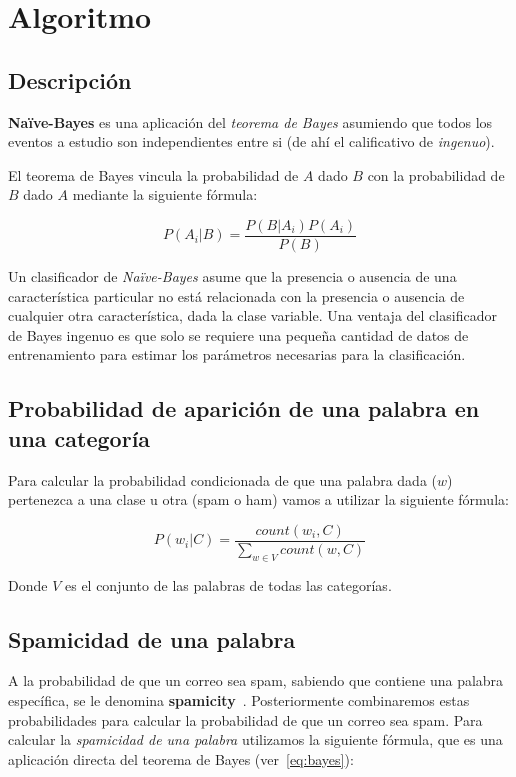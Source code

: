 \section{Algoritmo}

\subsection{Descripción}

\textbf{Naïve-Bayes} es una aplicación del \textit{teorema de Bayes} asumiendo
que todos los eventos a estudio son independientes entre si (de ahí el
calificativo de \textit{ingenuo}).

El teorema de Bayes vincula la probabilidad de $A$ dado $B$ con la probabilidad
de $B$ dado $A$ mediante la siguiente fórmula:

\begin{equation}
	\label{eq:bayes}
	P(A_i | B) = \frac{P(B | A_i) P(A_i)}{P(B)}
\end{equation}

Un clasificador de \textit{Naïve-Bayes} asume que la presencia o ausencia de una
característica particular no está relacionada con la presencia o ausencia de
cualquier otra característica, dada la clase variable. Una ventaja del
clasificador de Bayes ingenuo es que solo se requiere una pequeña cantidad de
datos de entrenamiento para estimar los parámetros necesarias para la
clasificación.

\subsection[Probabilidad de una palabra]{Probabilidad de aparición de una palabra en una categoría}

Para calcular la probabilidad condicionada de que una palabra dada ($w$)
pertenezca a una clase u otra (spam o ham) vamos a utilizar la siguiente
fórmula:

\begin{equation}
	\label{eq:prob-palabra}
	P(w_i|C) = \frac{count(w_i, C)}{\displaystyle\sum_{w \in V}{count(w, C)}}
\end{equation}

Donde $V$ es el conjunto de las palabras de todas las categorías.

\subsection{Spamicidad de una palabra}

A la probabilidad de que un correo sea spam, sabiendo que contiene una palabra
específica, se le denomina \textbf{spamicity}~\cite{eberhardt2015bayesian}.
Posteriormente combinaremos estas probabilidades para calcular la probabilidad
de que un correo sea spam. Para calcular la \textit{spamicidad de una palabra}
utilizamos la siguiente fórmula, que es una aplicación directa del teorema de
Bayes (ver~\ref{eq:bayes}):

